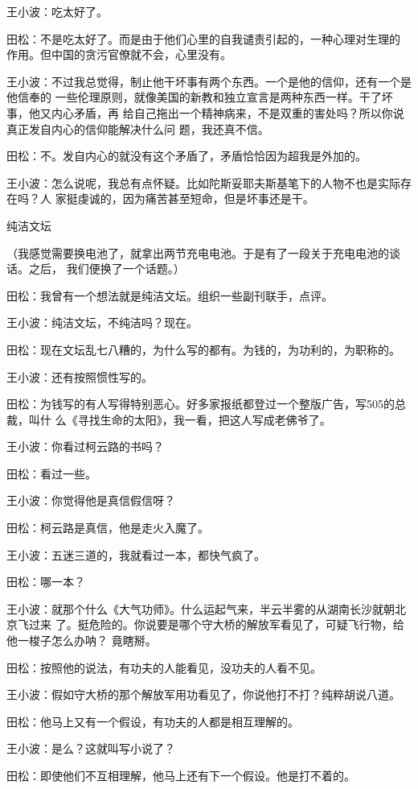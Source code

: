 王小波：吃太好了。


田松：不是吃太好了。而是由于他们心里的自我谴责引起的，一种心理对生理的
作用。但中国的贪污官僚就不会，心里没有。


王小波：不过我总觉得，制止他干坏事有两个东西。一个是他的信仰，还有一个是他信奉的
一些伦理原则，就像美国的新教和独立宣言是两种东西一样。干了坏事，他又内心矛盾，再
给自己拖出一个精神病来，不是双重的害处吗？所以你说真正发自内心的信仰能解决什么问
题，我还真不信。


田松：不。发自内心的就没有这个矛盾了，矛盾恰恰因为超我是外加的。


王小波：怎么说呢，我总有点怀疑。比如陀斯妥耶夫斯基笔下的人物不也是实际存在吗？人
家挺虔诚的，因为痛苦甚至短命，但是坏事还是干。


纯洁文坛


（我感觉需要换电池了，就拿出两节充电电池。于是有了一段关于充电电池的谈话。之后，
我们便换了一个话题。）


田松：我曾有一个想法就是纯洁文坛。组织一些副刊联手，点评。


王小波：纯洁文坛，不纯洁吗？现在。


田松：现在文坛乱七八糟的，为什么写的都有。为钱的，为功利的，为职称的。

王小波：还有按照惯性写的。


田松：为钱写的有人写得特别恶心。好多家报纸都登过一个整版广告，写505的总裁，叫什
么《寻找生命的太阳》，我一看，把这人写成老佛爷了。


王小波：你看过柯云路的书吗？


田松：看过一些。


王小波：你觉得他是真信假信呀？


田松：柯云路是真信，他是走火入魔了。


王小波：五迷三道的，我就看过一本，都快气疯了。


田松：哪一本？


王小波：就那个什么《大气功师》。什么运起气来，半云半雾的从湖南长沙就朝北京飞过来
了。挺危险的。你说要是哪个守大桥的解放军看见了，可疑飞行物，给他一梭子怎么办呐？
竟瞎掰。


田松：按照他的说法，有功夫的人能看见，没功夫的人看不见。


王小波：假如守大桥的那个解放军用功看见了，你说他打不打？纯粹胡说八道。


田松：他马上又有一个假设，有功夫的人都是相互理解的。


王小波：是么？这就叫写小说了？


田松：即使他们不互相理解，他马上还有下一个假设。他是打不着的。


